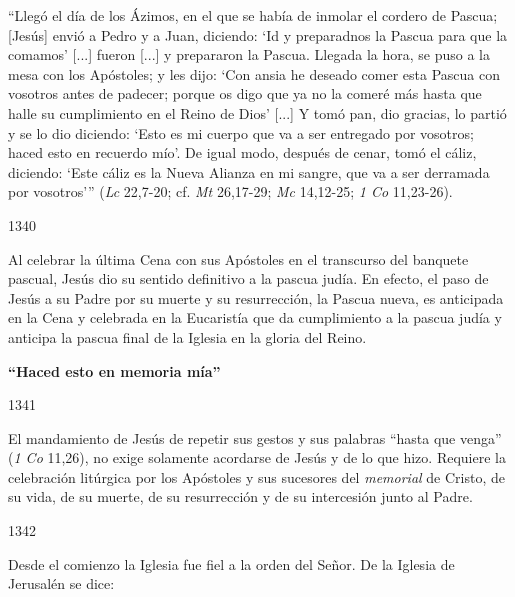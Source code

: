 			\begin{ccecite}“Llegó el día de los Ázimos, en el que se había de inmolar el cordero de Pascua; [Jesús] envió a Pedro y a Juan, diciendo: ‘Id y preparadnos la Pascua para que la comamos’ [...] fueron [...] y prepararon la Pascua. Llegada la hora, se puso a la mesa con los Apóstoles; y les dijo: ‘Con ansia he deseado comer esta Pascua con vosotros antes de padecer; porque os digo que ya no la comeré más hasta que halle su cumplimiento en el Reino de Dios’ [...] Y tomó pan, dio gracias, lo partió y se lo dio diciendo: ‘Esto es mi cuerpo que va a ser entregado por vosotros; haced esto en recuerdo mío’. De igual modo, después de cenar, tomó el cáliz, diciendo: ‘Este cáliz es la Nueva Alianza en mi sangre, que va a ser derramada por vosotros’” (\textit{Lc} 22,7-20; cf. \textit{Mt} 26,17-29; \textit{Mc} 14,12-25; \textit{1 Co} 11,23-26).\end{ccecite}
			
			\begin{ccebody}\begin{ccenumber}1340\end{ccenumber} Al celebrar la última Cena con sus Apóstoles en el transcurso del banquete pascual, Jesús dio su sentido definitivo a la pascua judía. En efecto, el paso de Jesús a su Padre por su muerte y su resurrección, la Pascua nueva, es anticipada en la Cena y celebrada en la Eucaristía que da cumplimiento a la pascua judía y anticipa la pascua final de la Iglesia en la gloria del Reino.\end{ccebody}
			
			\begin{ccebody}\textbf{“Haced esto en memoria mía”}\end{ccebody}
			
			\begin{ccebody}\begin{ccenumber}1341\end{ccenumber} El mandamiento de Jesús de repetir sus gestos y sus palabras “hasta que venga” (\textit{1 Co} 11,26), no exige solamente acordarse de Jesús y de lo que hizo. Requiere la celebración litúrgica por los Apóstoles y sus sucesores del \textit{memorial} de Cristo, de su vida, de su muerte, de su resurrección y de su intercesión junto al Padre.\end{ccebody}
			
			\begin{ccebody}\begin{ccenumber}1342\end{ccenumber} Desde el comienzo la Iglesia fue fiel a la orden del Señor. De la Iglesia de Jerusalén se dice:\end{ccebody}
			

